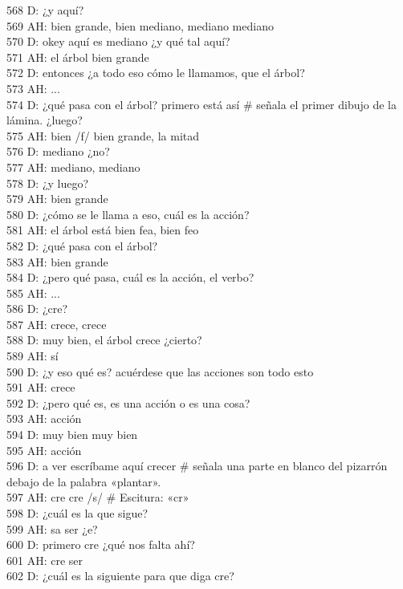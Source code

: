 568 D: ¿y aquí?\\
569 AH: bien grande, bien mediano, mediano mediano\\
570 D: okey aquí es mediano ¿y qué tal aquí?\\
571 AH: el árbol bien grande\\
572 D: entonces ¿a todo eso cómo le llamamos, que el árbol?\\
573 AH: ...\\
574 D: ¿qué pasa con el árbol? primero está así \# señala el primer dibujo de la lámina. ¿luego?\\
575 AH: bien /f/ bien grande, la mitad\\
576 D: mediano ¿no?\\
577 AH: mediano, mediano\\
578 D: ¿y luego?\\
579 AH: bien grande\\
580 D: ¿cómo se le llama a eso, cuál es la acción?\\
581 AH: el árbol está bien fea, bien feo\\
582 D: ¿qué pasa con el árbol?\\
583 AH: bien grande\\
584 D: ¿pero qué pasa, cuál es la acción, el verbo?\\
585 AH: ...\\
586 D: ¿cre?\\
587 AH: crece, crece\\
588 D: muy bien, el árbol crece ¿cierto?\\
589 AH: sí\\
590 D: ¿y eso qué es? acuérdese que las acciones son todo esto\\
591 AH: crece\\
592 D: ¿pero qué es, es una acción o es una cosa?\\
593 AH: acción\\
594 D: muy bien muy bien\\
595 AH: acción\\
596 D: a ver escríbame aquí crecer \# señala una parte en blanco del pizarrón debajo de la palabra «plantar».\\
597 AH: cre cre /s/ \# Escitura: «cr»\\
598 D: ¿cuál es la que sigue?\\
599 AH: sa ser ¿e?\\
600 D: primero cre ¿qué nos falta ahí?\\
601 AH: cre ser\\
602 D: ¿cuál es la siguiente para que diga cre?\\
